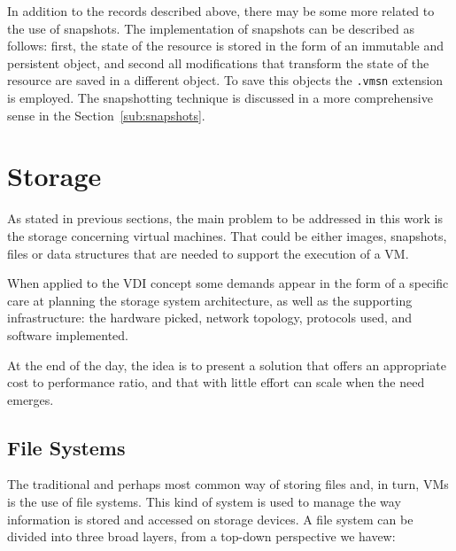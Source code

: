 In addition to the records described above, there may be some more related to the use of snapshots. The implementation of snapshots can be described as follows: first, the state of the resource is stored in the form of an immutable and persistent object, and second all modifications that transform the state of the resource are saved in a different object. To save this objects the \texttt{.vmsn} extension is employed.
The snapshotting technique is discussed in a more comprehensive sense in the Section~\ref{sub:snapshots}.


\section{Storage} %
\label{sec:storage}

As stated in previous sections, the main problem to be addressed in this work is the storage concerning virtual machines. That could be either images, snapshots, files or data structures that are needed to support the execution of a VM. 

When applied to the VDI concept some demands appear in the form of a specific care at planning the storage system architecture, as well as the supporting infrastructure: the hardware picked, network topology, protocols used, and software implemented.

At the end of the day, the idea is to present a solution that offers an appropriate cost to performance ratio, and that with little effort can scale when the need emerges.


\subsection{File Systems} %
\label{sub:file_systems}

The traditional and perhaps most common way of storing files and, in turn, VMs is the use of file systems.
This kind of system is used to manage the way information is stored and accessed on storage devices. A file system can be divided into three broad layers, from a top-down perspective we havew:

